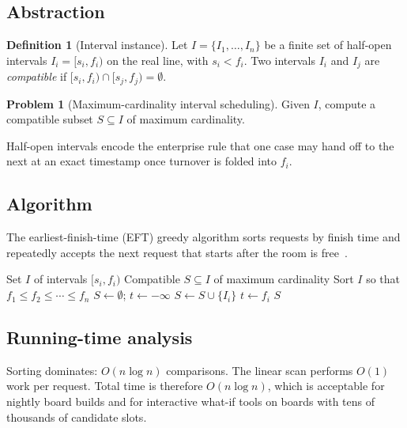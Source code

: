 \documentclass[sigconf,review=false]{acmart}
\theoremstyle{definition}
\newtheorem{definition}[theorem]{Definition}
\newtheorem{problem}[theorem]{Problem}
\begin{document}
\subsection{Abstraction}
\label{sec:greedy-abs}

\begin{definition}[Interval instance]
Let $I = \{I_1,\ldots,I_n\}$ be a finite set of half-open intervals
$I_i = [s_i,f_i)$ on the real line, with $s_i < f_i$.
Two intervals $I_i$ and $I_j$ are \emph{compatible} if
$[s_i,f_i) \cap [s_j,f_j) = \emptyset$.
\end{definition}

\begin{problem}[Maximum-cardinality interval scheduling]
Given $I$, compute a compatible subset $S\subseteq I$ of maximum cardinality.
\end{problem}

Half-open intervals encode the enterprise rule that one case may hand off
to the next at an exact timestamp once turnover is folded into $f_i$.

\subsection{Algorithm}
\label{sec:greedy-alg}

The earliest-finish-time (EFT) greedy algorithm sorts requests by finish
time and repeatedly accepts the next request that starts after the room
is free~\cite{kt2005}.

\begin{algorithm}[t]
\caption{Earliest-Finish-Time Interval Scheduling}
\label{alg:eft}
\begin{algorithmic}[1]
\Require Set $I$ of intervals $[s_i,f_i)$
\Ensure Compatible $S\subseteq I$ of maximum cardinality
\State Sort $I$ so that $f_1 \le f_2 \le \cdots \le f_n$
\State $S \gets \emptyset$;\; $t \gets -\infty$
    \State $S \gets S \cup \{I_i\}$
    \State $t \gets f_i$
  \EndIf
\EndFor
\State \Return $S$
\end{algorithmic}
\end{algorithm}

\subsection{Running-time analysis}
\label{sec:greedy-rt}

Sorting dominates: $O(n\log n)$ comparisons. The linear scan performs
$O(1)$ work per request. Total time is therefore $O(n\log n)$, which is
acceptable for nightly board builds and for interactive what-if tools on
boards with tens of thousands of candidate slots.
\end{document}
